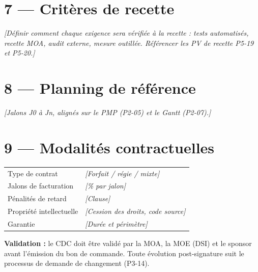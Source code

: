 \documentclass[11pt,a4paper,oneside]{report}
\begin{document}
\section*{7 --- Critères de recette}

\textit{[Définir comment chaque exigence sera vérifiée à la recette : tests automatisés, recette MOA, audit externe, mesure outillée. Référencer les PV de recette P5-19 et P5-20.]}

\section*{8 --- Planning de référence}

\textit{[Jalons J0 à Jn, alignés sur le PMP (P2-05) et le Gantt (P2-07).]}

\section*{9 --- Modalités contractuelles}

\renewcommand{\arraystretch}{1.3}
\begin{tabularx}{\textwidth}{L{4cm} Y}
\toprule
{} &  \\
\midrule
Type de contrat         & \textit{[Forfait / régie / mixte]} \\
Jalons de facturation   & \textit{[\% par jalon]} \\
Pénalités de retard     & \textit{[Clause]} \\
Propriété intellectuelle & \textit{[Cession des droits, code source]} \\
Garantie                & \textit{[Durée et périmètre]} \\
\bottomrule
\end{tabularx}

\begin{reco}
\textbf{Validation :} le CDC doit être validé par la MOA, la MOE (DSI) et le sponsor avant l'émission du bon de commande. Toute évolution post-signature suit le processus de demande de changement (P3-14).
\end{reco}
\end{document}
